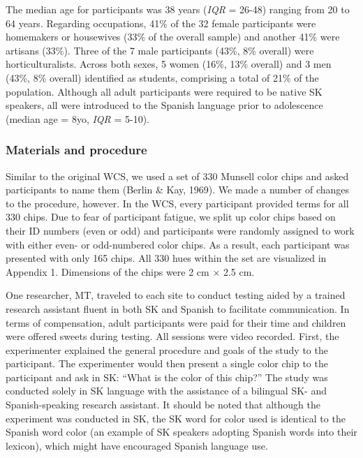 \documentclass[
  ,apa7,floatsintext]{apa6}
\begin{document}
The median age for participants was 38 years (\emph{IQR} = 26-48) ranging from 20 to 64 years. Regarding occupations, 41\% of the 32 female participants were homemakers or housewives (33\% of the overall sample) and another 41\% were artisans (33\%). Three of the 7 male participants (43\%, 8\% overall) were horticulturalists. Across both sexes, 5 women (16\%, 13\% overall) and 3 men (43\%, 8\% overall) identified as students, comprising a total of 21\% of the population. Although all adult participants were required to be native SK speakers, all were introduced to the Spanish language prior to adolescence (median age = 8yo, \emph{IQR} = 5-10).

\hypertarget{materials-and-procedure}{%
\subsubsection{Materials and procedure}\label{materials-and-procedure}}

Similar to the original WCS, we used a set of 330 Munsell color chips and asked participants to name them (Berlin \& Kay, 1969). We made a number of changes to the procedure, however. In the WCS, every participant provided terms for all 330 chips. Due to fear of participant fatigue, we split up color chips based on their ID numbers (even or odd) and participants were randomly assigned to work with either even- or odd-numbered color chips. As a result, each participant was presented with only 165 chips. All 330 hues within the set are visualized in Appendix 1. Dimensions of the chips were 2 cm × 2.5 cm.

One researcher, MT, traveled to each site to conduct testing aided by a trained research assistant fluent in both SK and Spanish to facilitate communication. In terms of compensation, adult participants were paid for their time and children were offered sweets during testing. All sessions were video recorded. First, the experimenter explained the general procedure and goals of the study to the participant. The experimenter would then present a single color chip to the participant and ask in SK: ``What is the color of this chip?'' The study was conducted solely in SK language with the assistance of a bilingual SK- and Spanish-speaking research assistant. It should be noted that although the experiment was conducted in SK, the SK word for color used is identical to the Spanish word color (an example of SK speakers adopting Spanish words into their lexicon), which might have encouraged Spanish language use.
\end{document}

